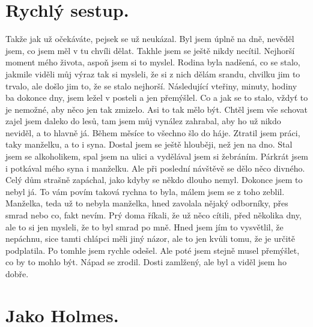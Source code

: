 \section{Rychlý sestup.}

Takže jak už očekáváte, pejsek se už neukázal. Byl jsem úplně na dně, nevěděl jsem, co jsem měl v tu chvíli dělat. Takhle jsem se ještě nikdy necítil. Nejhorší moment mého života, aspoň jsem si to myslel. Rodina byla nadšená, co se stalo, jakmile viděli můj výraz tak si mysleli, že si z nich dělám srandu, chvilku jim to trvalo, ale došlo jim to, že se stalo nejhorší. Následující vteřiny, minuty, hodiny ba dokonce dny, jsem ležel v posteli a jen přemýšlel. Co a jak se to stalo, vždyť to je nemožné, aby něco jen tak zmizelo. Asi to tak mělo být. Chtěl jsem vše schovat zajel jsem daleko do lesů, tam jsem můj vynález zahrabal, aby ho už nikdo neviděl, a to hlavně já. Během měsíce to všechno šlo do háje. Ztratil jsem práci, taky manželku, a to i syna. Dostal jsem se ještě hlouběji, než jen na dno. Stal jsem se alkoholikem, spal jsem na ulici a vydělával jsem si žebráním. Párkrát jsem i potkával mého syna i manželku. Ale při poslední návštěvě se dělo něco divného. Celý dům strašně zapáchal, jako kdyby se někdo dlouho nemyl. Dokonce jsem to nebyl já. To vám povím taková rychna to byla, málem jsem se z toho zeblil. Manželka, teda už to nebyla manželka, hned zavolala nějaký odborníky, přes smrad nebo co, fakt nevím. Prý doma říkali, že už něco cítili, před několika dny, ale to si jen mysleli, že to byl smrad po mně. Hned jsem jím to vysvětlil, že nepáchnu, sice tamti chlápci měli jiný názor, ale to jen kvůli tomu, že je určitě podplatila. Po tomhle jsem rychle odešel. Ale poté jsem stejně musel přemýšlet, co by to mohlo být. Nápad se zrodil. Dosti zamlžený, ale byl a viděl jsem ho dobře.

\section{Jako Holmes.}

